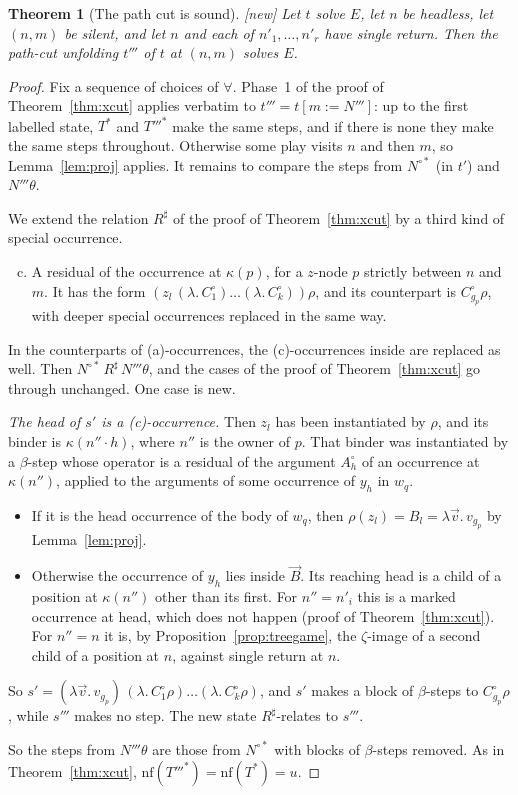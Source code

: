 \documentclass[11pt]{article}
\newcommand{\suc}[2]{#1{\cdot}#2}
\newcommand{\New}{\textsf{[new]}}
\theoremstyle{plain}
\newtheorem{theorem}{Theorem}[section]
\theoremstyle{definition}
\theoremstyle{remark}
\begin{document}
\begin{theorem}[The path cut is sound]\label{thm:pathcut}
\New{} Let $t$ solve $E$, let $n$ be headless, let $(n,m)$ be silent,
and let $n$ and each of $n'_1,\dots,n'_r$ have single return.  Then the
path-cut unfolding $t'''$ of $t$ at $(n,m)$ solves $E$.
\end{theorem}
\begin{proof}
Fix a sequence of choices of $\forall$.  Phase~1 of the proof of
Theorem~\ref{thm:xcut} applies verbatim to $t'''=t[m:=N''']$: up to the
first labelled state, $T^*$ and $T'''^*$ make the same steps, and if
there is none they make the same steps throughout.  Otherwise some play
visits $n$ and then $m$, so Lemma~\ref{lem:proj} applies.  It remains to
compare the steps from $N^{\circ*}$ (in $t'$) and $N'''\theta$.

We extend the relation $R^\sharp$ of the proof of
Theorem~\ref{thm:xcut} by a third kind of special occurrence.
\begin{enumerate}[(a)]
\setcounter{enumi}{2}
\item A residual of the occurrence at $\kappa(p)$, for a $z$-node $p$
  strictly between $n$ and $m$.  It has the form
  $(z_l\,(\lambda.\,C^\circ_1)\dots(\lambda.\,C^\circ_k))\rho$, and its
  counterpart is $C^\circ_{g_p}\rho$, with deeper special occurrences
  replaced in the same way.
\end{enumerate}
In the counterparts of (a)-occurrences, the (c)-occurrences inside are
replaced as well.  Then $N^{\circ*}\,R^\sharp\,N'''\theta$, and the cases
of the proof of Theorem~\ref{thm:xcut} go through unchanged.  One case is
new.

\emph{The head of $s'$ is a (c)-occurrence.}  Then $z_l$ has been
instantiated by $\rho$, and its binder is $\kappa(\suc{n''}h)$, where
$n''$ is the owner of $p$.  That binder was instantiated by a
$\beta$-step whose operator is a residual of the argument $A^\circ_h$ of
an occurrence at $\kappa(n'')$, applied to the arguments of some
occurrence of $y_h$ in $w_q$.
\begin{itemize}
\item If it is the head occurrence of the body of $w_q$, then
  $\rho(z_l)=B_l=\lambda\vec v.\,v_{g_p}$ by Lemma~\ref{lem:proj}.
\item Otherwise the occurrence of $y_h$ lies inside $\vec B$.  Its
  reaching head is a child of a position at $\kappa(n'')$ other than its
  first.  For $n''=n'_i$ this is a marked occurrence at head, which
  does not happen (proof of Theorem~\ref{thm:xcut}).  For $n''=n$ it is,
  by Proposition~\ref{prop:treegame}, the $\zeta$-image of a second child
  of a position at $n$, against single return at $n$.
\end{itemize}
So $s'=(\lambda\vec v.\,v_{g_p})\,(\lambda.\,C^\circ_1\rho)\dots
(\lambda.\,C^\circ_k\rho)$, and $s'$ makes a block of $\beta$-steps
to $C^\circ_{g_p}\rho$, while $s'''$ makes no step.  The new state
$R^\sharp$-relates to $s'''$.

So the steps from $N'''\theta$ are those from $N^{\circ*}$ with blocks
of $\beta$-steps removed.  As in Theorem~\ref{thm:xcut},
$\mathrm{nf}(T'''^*)=\mathrm{nf}(T^*)=u$.
\end{proof}
\end{document}
